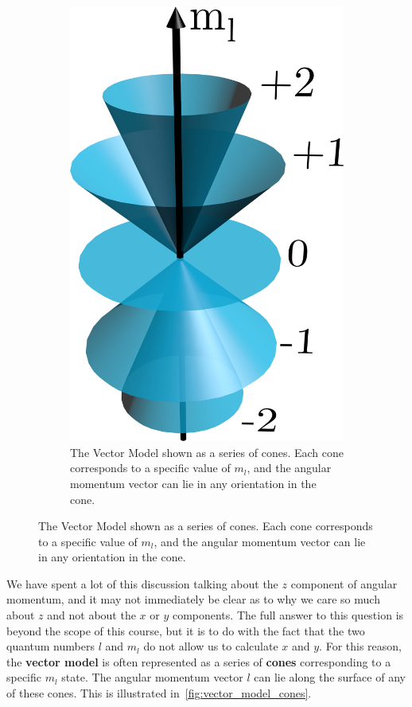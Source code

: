 \documentclass{memoir}[11pt,oneside,a4paper,openany]
\begin{document}
\begin{figure}[h]
\begin{subfigure}[b]{0.25\textwidth}
	\includegraphics[width=\textwidth]{vector_model_cones}
		\caption{The Vector Model shown as a series of cones. Each cone corresponds to a specific value of $m_l$, and the angular momentum vector can lie in any orientation in the cone.}\label{fig:vector_model_cones}
	\end{subfigure}
\end{figure}
	
We have spent a lot of this discussion talking about the $z$ component of angular momentum, and it may not immediately be clear as to why we care so much about $z$ and not about the $x$ or $y$ components. The full answer to this question is beyond the scope of this course, but it is to do with the fact that the two quantum numbers $l$ and $m_l$ do not allow us to calculate $x$ and $y$. For this reason, the \textbf{vector model} is often represented as a series of \textbf{cones} corresponding to a specific $m_l$ state. The angular momentum vector $l$ can lie along the surface of any of these cones. This is illustrated in~\autoref{fig:vector_model_cones}. 
\vfill
\end{document}
